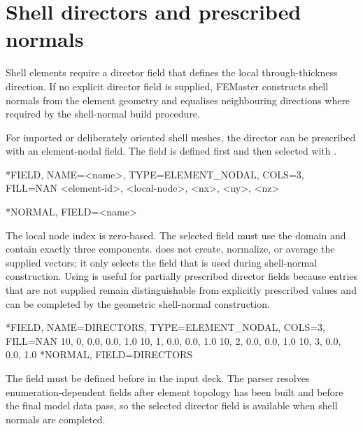 \section{Shell directors and prescribed normals}
\label{sec:shell-directors}

Shell elements require a director field that defines the local through-thickness direction. If no explicit director field is supplied, FEMaster constructs shell normals from the element geometry and equalises neighbouring directions where required by the shell-normal build procedure.

For imported or deliberately oriented shell meshes, the director can be prescribed with an element-nodal field. The field is defined first and then selected with .

\begin{syntax}
*FIELD, NAME=<name>, TYPE=ELEMENT_NODAL, COLS=3, FILL=NAN
<element-id>, <local-node>, <nx>, <ny>, <nz>

*NORMAL, FIELD=<name>
\end{syntax}

The local node index is zero-based. The selected field must use the  domain and contain exactly three components.  does not create, normalize, or average the supplied vectors; it only selects the field that is used during shell-normal construction. Using  is useful for partially prescribed director fields because entries that are not supplied remain distinguishable from explicitly prescribed values and can be completed by the geometric shell-normal construction.

\begin{exampledeck}
*FIELD, NAME=DIRECTORS, TYPE=ELEMENT_NODAL, COLS=3, FILL=NAN
10, 0, 0.0, 0.0, 1.0
10, 1, 0.0, 0.0, 1.0
10, 2, 0.0, 0.0, 1.0
10, 3, 0.0, 0.0, 1.0
*NORMAL, FIELD=DIRECTORS
\end{exampledeck}

The field must be defined before  in the input deck. The parser resolves enumeration-dependent fields after element topology has been built and before the final model data pass, so the selected director field is available when shell normals are completed.
